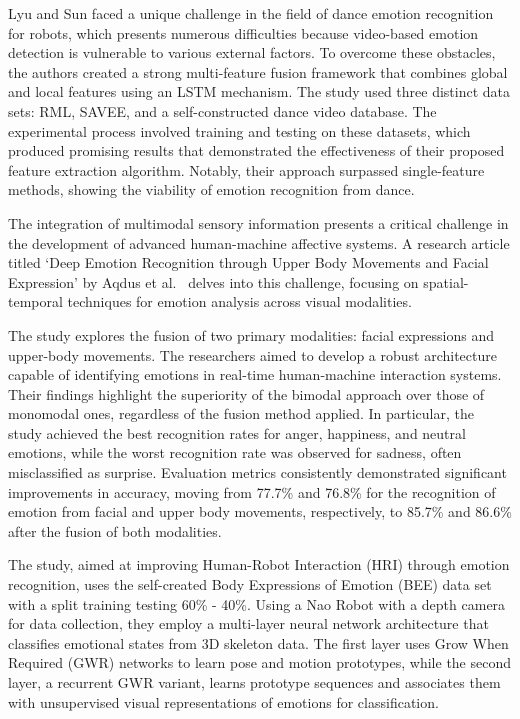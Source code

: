 Lyu and Sun \cite{Lyu2022-vd} faced a unique challenge in the field of dance emotion recognition for robots, which presents numerous difficulties because video-based emotion detection is vulnerable to various external factors. To overcome these obstacles, the authors created a strong multi-feature fusion framework that combines global and local features using an LSTM mechanism. The study used three distinct data sets: RML, SAVEE, and a self-constructed dance video database. The experimental process involved training and testing on these datasets, which produced promising results that demonstrated the effectiveness of their proposed feature extraction algorithm. Notably, their approach surpassed single-feature methods, showing the viability of emotion recognition from dance.

The integration of multimodal sensory information presents a critical challenge in the development of advanced human-machine affective systems. A research article titled `Deep Emotion Recognition through Upper Body Movements and Facial Expression' by Aqdus et al.\ \cite{Aqdus2021-xr} delves into this challenge, focusing on spatial-temporal techniques for emotion analysis across visual modalities.

The study explores the fusion of two primary modalities: facial expressions and upper-body movements. The researchers aimed to develop a robust architecture capable of identifying emotions in real-time human-machine interaction systems. Their findings highlight the superiority of the bimodal approach over those of monomodal ones, regardless of the fusion method applied. In particular, the study achieved the best recognition rates for anger, happiness, and neutral emotions, while the worst recognition rate was observed for sadness, often misclassified as surprise. Evaluation metrics consistently demonstrated significant improvements in accuracy, moving from 77.7\% and 76.8\% for the recognition of emotion from facial and upper body movements, respectively, to 85.7\% and 86.6\% after the fusion of both modalities.

The study, aimed at improving Human-Robot Interaction (HRI) through emotion recognition, uses the self-created Body Expressions of Emotion (BEE) data set with a split training testing 60\% - 40\%. Using a Nao Robot with a depth camera for data collection, they employ a multi-layer neural network architecture that classifies emotional states from 3D skeleton data. The first layer uses Grow When Required (GWR) networks to learn pose and motion prototypes, while the second layer, a recurrent GWR variant, learns prototype sequences and associates them with unsupervised visual representations of emotions for classification.

